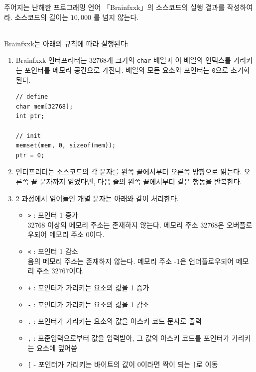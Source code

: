 주어지는 난해한 프로그래밍 언어 「Brainfxxk」의 소스코드의 실행 결과를 작성하여라. 소스코드의 길이는 $10,000$ 를 넘지 않는다.  

\\

Brainfxxk는 아래의 규칙에 따라 실행된다:

\begin{enumerate}
\item 
Brainfxxk 인터프리터는 32768개 크기의 \texttt{char} 배열과 이 배열의 인덱스를 가리키는 포인터를 메모리 공간으로 가진다. 배열의 모든 요소와 포인터는 \texttt{0}으로 초기화된다.

\begin{lstlisting}
// define
char mem[32768];
int ptr;

// init
memset(mem, 0, sizeof(mem));
ptr = 0;
\end{lstlisting}

\item 
인터프리터는 소스코드의 각 문자를 왼쪽 끝에서부터 오른쪽 방향으로 읽는다. 오른쪽 끝 문자까지 읽었다면, 다음 줄의 왼쪽 끝에서부터 같은 행동을 반복한다.


\item 
2 과정에서 읽어들인 개별 문자는 아래와 같이 처리한다.

\begin{itemize}
\item 
\texttt{>} : 포인터 1 증가\\
32768 이상의 메모리 주소는 존재하지 않는다. 메모리 주소 32768은 오버플로우되어 메모리 주소 0이다.


\item 
\texttt{<} : 포인터 1 감소\\
음의 메모리 주소는 존재하지 않는다. 메모리 주소 -1은 언더플로우되어 메모리 주소 32767이다.


\item 
\texttt{+} : 포인터가 가리키는 요소의 값을 1 증가


\item 
\texttt{-} : 포인터가 가리키는 요소의 값을 1 감소


\item 
\texttt{.} : 포인터가 가리키는 요소의 값을 아스키 코드 문자로 출력


\item 
\texttt{,} : 표준입력으로부터 값을 입력받아, 그 값의 아스키 코드를 포인터가 가리키는 요소에 덮어씀


\item 
\texttt{[} - 포인터가 가리키는 바이트의 값이 0이라면 짝이 되는 \texttt{]}로 이동



\end{itemize}
\end{enumerate}
